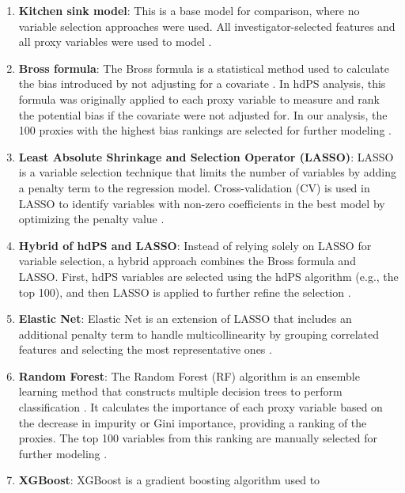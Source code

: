\documentclass[sn-vancouver,Numbered,lineno,pdflatex]{sn-jnl}
\begin{document}
\begin{enumerate}
\def\labelenumi{\arabic{enumi}.}
\item
  \textbf{Kitchen sink model}: This is a base model for comparison,
  where no variable selection approaches were used. All
  investigator-selected features and all proxy variables were used to
  model \citep{karim2018can}.
\item
  \textbf{Bross formula}: The Bross formula is a statistical method used
  to calculate the bias introduced by not adjusting for a covariate
  \citep{bross1966spurious}. In hdPS analysis, this formula was
  originally applied to each proxy variable to measure and rank the
  potential bias if the covariate were not adjusted for. In our
  analysis, the 100 proxies with the highest bias rankings are selected
  for further modeling \citep{schneeweiss2009high, wyss2018erratum}.
\item
  \textbf{Least Absolute Shrinkage and Selection Operator (LASSO)}:
  LASSO is a variable selection technique that limits the number of
  variables by adding a penalty term to the regression model.
  Cross-validation (CV) is used in LASSO to identify variables with
  non-zero coefficients in the best model by optimizing the penalty
  value
  \citep{franklin2015regularized, schneeweiss2017variable, karim2018can}.
\item
  \textbf{Hybrid of hdPS and LASSO}: Instead of relying solely on LASSO
  for variable selection, a hybrid approach combines the Bross formula
  and LASSO. First, hdPS variables are selected using the hdPS algorithm
  (e.g., the top 100), and then LASSO is applied to further refine the
  selection \citep{karim2018can, franklin2015regularized}.
\item
  \textbf{Elastic Net}: Elastic Net is an extension of LASSO that
  includes an additional penalty term to handle multicollinearity by
  grouping correlated features and selecting the most representative
  ones \citep{karim2018can}.
\item
  \textbf{Random Forest}: The Random Forest (RF) algorithm is an
  ensemble learning method that constructs multiple decision trees to
  perform classification \citep{breiman2001random}. It calculates the
  importance of each proxy variable based on the decrease in impurity or
  Gini importance, providing a ranking of the proxies. The top 100
  variables from this ranking are manually selected for further modeling
  \citep{schneeweiss2017variable}.
\item
  \textbf{XGBoost}: XGBoost is a gradient boosting algorithm used to

\end{enumerate}
\end{document}
